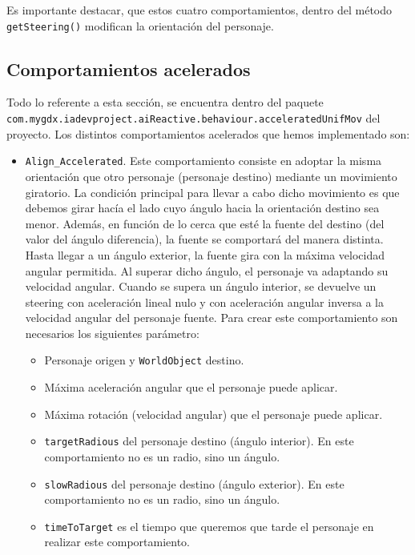 Es importante destacar, que estos cuatro comportamientos, dentro del método \texttt{getSteering()} modifican la orientación del personaje.


\medskip
\subsection{Comportamientos acelerados}
Todo lo referente a esta sección, se encuentra dentro del paquete \\ \texttt{com.mygdx.iadevproject.aiReactive.behaviour.acceleratedUnifMov} del proyecto. Los distintos comportamientos acelerados que hemos implementado son:
\begin{itemize}
 \item \texttt{Align\_Accelerated}. Este comportamiento consiste en adoptar la misma orientación que otro personaje (personaje destino) mediante un movimiento giratorio. La condición principal para llevar a cabo dicho movimiento es que debemos girar hacía el lado cuyo ángulo hacia la orientación destino sea menor. Además, en función de lo cerca que esté la fuente del destino (del valor del ángulo diferencia), la fuente se comportará del manera distinta. Hasta llegar a un ángulo exterior, la fuente gira con la máxima velocidad angular permitida. Al superar dicho ángulo, el personaje va adaptando su velocidad angular. Cuando se supera un ángulo interior, se devuelve un steering con aceleración lineal nulo y con aceleración angular inversa a la velocidad angular del personaje fuente. Para crear este comportamiento son necesarios los siguientes parámetro:
 \begin{itemize}
 	\item Personaje origen y \texttt{WorldObject} destino.
 	\item Máxima aceleración angular que el personaje puede aplicar.
 	\item Máxima rotación (velocidad angular) que el personaje puede aplicar.
 	\item \texttt{targetRadious} del personaje destino (ángulo interior). En este comportamiento no es un radio, sino un ángulo.
 	\item \texttt{slowRadious} del personaje destino (ángulo exterior). En este comportamiento no es un radio, sino un ángulo.
 	\item \texttt{timeToTarget} es el tiempo que queremos que tarde el personaje en realizar este comportamiento.
 \end{itemize}

\end{itemize}
